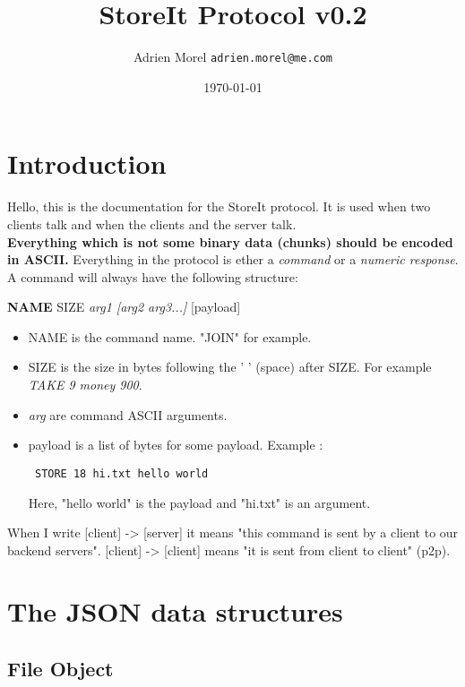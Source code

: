 \documentclass{article}
\begin{document}
  \title{StoreIt Protocol v0.2}
  \author{Adrien Morel \texttt{adrien.morel@me.com}}
  \date{\today}
  \maketitle

\section{Introduction}

Hello, this is the documentation for the StoreIt protocol. It is used when two clients talk and when the clients and the server talk.\\
\textbf{Everything which is not some binary data (chunks) should be encoded in ASCII.} Everything in the protocol is ether a \textit{command} or a \textit{numeric response}. A command will always have the following structure:\\
\begin{center}
\textbf{NAME} SIZE \textit{arg1 [arg2 arg3...]} [payload]
\end{center}

\begin{itemize}
  \item NAME is the command name. "JOIN" for example.
  \item SIZE is the size in bytes following the ' ' (space) after SIZE. For example \textit{TAKE 9 money 900}.
  \item \textit{arg} are command ASCII arguments.
  \item payload is a list of bytes for some payload. Example :\\
\begin{lstlisting}
 STORE 18 hi.txt hello world
\end{lstlisting}
Here, "hello world" is the payload and "hi.txt" is an argument.
\end{itemize}
When I write [client] -> [server] it means "this command is sent by a client to our backend servers". [client] -> [client] means "it is sent from client to client" (p2p).\\
\section{The JSON data structures}
\subsection{File Object}
\end{document}
